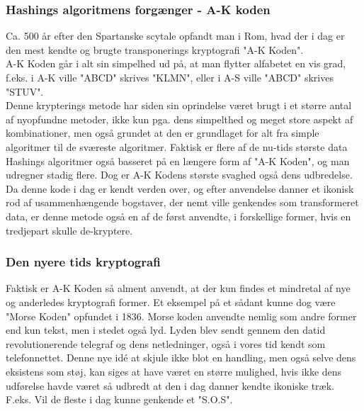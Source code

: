 \subsubsection{Hashings algoritmens forgænger - A-K koden}
Ca. 500 år efter den Spartanske scytale opfandt man i Rom, hvad der i dag er den mest kendte og brugte transponerings kryptografi "A-K Koden".\\
A-K Koden går i alt sin simpelhed ud på, at man flytter alfabetet en vis grad, f.eks. i A-K ville "ABCD" skrives "KLMN", eller i A-S ville "ABCD" skrives "STUV".\cite{TheSecretLanguage}\\
Denne krypterings metode har siden sin oprindelse været brugt i et større antal af nyopfundne metoder, ikke kun pga. dens simpelthed og meget store aspekt af kombinationer, men også grundet at den er grundlaget for alt fra simple algoritmer til de sværeste algoritmer. Faktisk er flere af de nu-tids største data Hashings algoritmer også basseret på en længere form af "A-K Koden", og man udregner stadig flere. Dog er A-K Kodens største svaghed også dens udbredelse. Da denne kode i dag er kendt verden over, og efter anvendelse danner et ikonisk rod af usammenhængende bogstaver, der nemt ville genkendes som transformeret data, er denne metode også en af de først anvendte, i forskellige former, hvis en tredjepart skulle de-kryptere.

\subsubsection{Den nyere tids kryptografi}
Faktisk er A-K Koden så alment anvendt, at der kun findes et mindretal af nye og anderledes kryptografi former. Et eksempel på et sådant kunne dog være "Morse Koden" opfundet i 1836. Morse koden anvendte nemlig som andre former end kun tekst, men i stedet også lyd. Lyden blev sendt gennem den datid revolutionerende telegraf og dens netledninger, også i vores tid kendt som telefonnettet.\cite{Telegraphing} Denne nye idé at skjule ikke blot en handling, men også selve dens eksistens som støj, kan siges at have været en større mulighed, hvis ikke dens udførelse havde været så udbredt at den i dag danner kendte ikoniske træk. F.eks. Vil de fleste i dag kunne genkende et "S.O.S".

